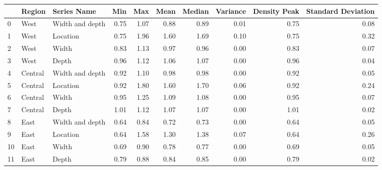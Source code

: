 \begin{tabular}{lllrrrrrrr}
\toprule
{} &   Region &      Series Name &   Min &   Max &  Mean &  Median &  Variance &  Density Peak &  Standard Deviation \\
\midrule
0  &     West &  Width and depth &  0.75 &  1.07 &  0.88 &    0.89 &      0.01 &          0.75 &                0.08 \\
1  &     West &         Location &  0.75 &  1.96 &  1.60 &    1.69 &      0.10 &          0.75 &                0.32 \\
2  &     West &            Width &  0.83 &  1.13 &  0.97 &    0.96 &      0.00 &          0.83 &                0.07 \\
3  &     West &            Depth &  0.96 &  1.12 &  1.06 &    1.07 &      0.00 &          0.96 &                0.04 \\
\midrule
4  &  Central &  Width and depth &  0.92 &  1.10 &  0.98 &    0.98 &      0.00 &          0.92 &                0.05 \\
5  &  Central &         Location &  0.92 &  1.80 &  1.60 &    1.70 &      0.06 &          0.92 &                0.24 \\
6  &  Central &            Width &  0.95 &  1.25 &  1.09 &    1.08 &      0.00 &          0.95 &                0.07 \\
7  &  Central &            Depth &  1.01 &  1.12 &  1.07 &    1.07 &      0.00 &          1.01 &                0.02 \\
\midrule
8  &     East &  Width and depth &  0.64 &  0.84 &  0.72 &    0.73 &      0.00 &          0.64 &                0.05 \\
9  &     East &         Location &  0.64 &  1.58 &  1.30 &    1.38 &      0.07 &          0.64 &                0.26 \\
10 &     East &            Width &  0.69 &  0.90 &  0.78 &    0.77 &      0.00 &          0.69 &                0.05 \\
11 &     East &            Depth &  0.79 &  0.88 &  0.84 &    0.85 &      0.00 &          0.79 &                0.02 \\
\bottomrule
\end{tabular}
